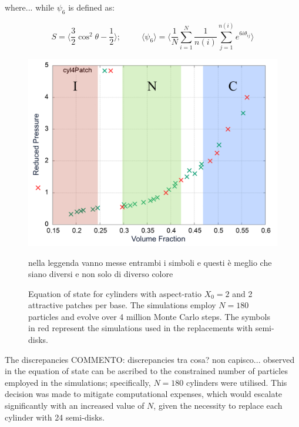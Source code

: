 \documentclass[aip,jcp, amsmath, amssymb, reprint]{revtex4-1}
\begin{document}
where...
while $\psi_6$ is defined as:

\begin{equation}  
\label{pordnem}
S= \bigg\langle \frac{3}{2} \cos^2\theta - \frac{1}{2} \bigg\rangle; \; \; \; \; \; \; \; \; \; \langle \psi_6\rangle=\bigg\langle \frac{1}{N} \sum_{i=1}^N \frac{1}{n(i)} \sum_{j=1}^{n(i)}e^{6i\theta_{ij}} \bigg\rangle
\end{equation}


\begin{figure}[h!]
\includegraphics[width=0.86\linewidth]{eos.png}
\caption{\label{fig:eos1} Equation of state for cylinders with aspect-ratio $X_0=2$ and 2 attractive patches per base. The simulations employ $N = 180$ particles and evolve over 4 million Monte Carlo steps. The symbols in red represent the simulations used in the replacements with semi-disks.}
{\color{red} nella leggenda vanno messe entrambi i simboli e questi è meglio che siano diversi
e non solo di diverso colore}
\end{figure}

The discrepancies {\color{red} COMMENTO: discrepancies tra cosa? non capisco...} observed in the equation of state can be ascribed to the constrained number of particles employed in the simulations; specifically, $N=180$ cylinders were utilised. This decision was made to mitigate computational expenses, which would escalate significantly with an increased value of $N$, given the necessity to replace each cylinder with 24 semi-disks.
\end{document}
